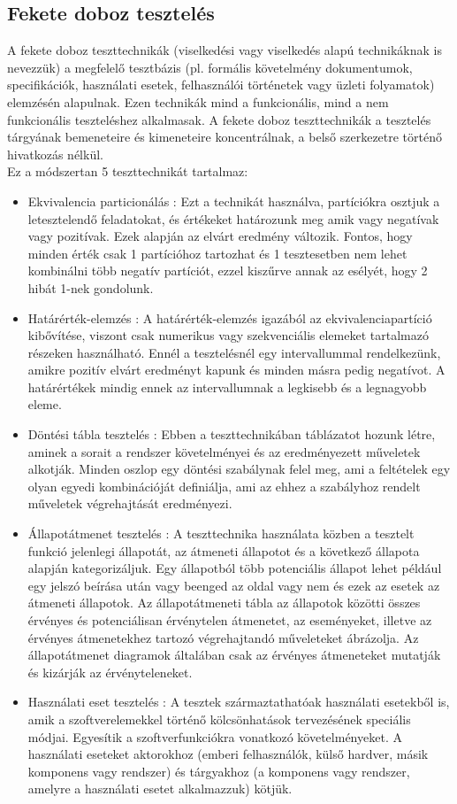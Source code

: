 \subsection{Fekete doboz tesztelés} A fekete doboz teszttechnikák (viselkedési vagy viselkedés alapú technikáknak is nevezzük) a megfelelő
tesztbázis (pl. formális követelmény dokumentumok, specifikációk, használati esetek, felhasználói történetek
vagy üzleti folyamatok) elemzésén alapulnak. Ezen technikák mind a funkcionális, mind a nem funkcionális
teszteléshez alkalmasak. A fekete doboz teszttechnikák a tesztelés tárgyának bemeneteire és kimeneteire
koncentrálnak, a belső szerkezetre történő hivatkozás nélkül.\\
Ez a módszertan 5 teszttechnikát tartalmaz:
\begin{itemize}
\item Ekvivalencia particionálás : Ezt a technikát használva, partíciókra osztjuk a letesztelendő feladatokat, és értékeket határozunk meg amik vagy negatívak vagy pozitívak. Ezek alapján az elvárt eredmény változik. Fontos, hogy minden érték csak 1 partícióhoz tartozhat és 1 tesztesetben nem lehet kombinálni több negatív partíciót, ezzel kiszűrve annak az esélyét, hogy 2 hibát 1-nek gondolunk\cite{syllabus2}.
\item Határérték-elemzés : A határérték-elemzés igazából az ekvivalenciapartíció kibővítése, viszont csak numerikus vagy szekvenciális elemeket tartalmazó részeken használható. Ennél a tesztelésnél egy intervallummal rendelkezünk, amikre pozitív elvárt eredményt kapunk és minden másra pedig negatívot. A határértékek mindig ennek az intervallumnak a legkisebb és a legnagyobb eleme\cite{syllabus2}.
\item Döntési tábla tesztelés : Ebben a teszttechnikában táblázatot hozunk létre, aminek a sorait a rendszer követelményei és az eredményezett műveletek alkotják. Minden oszlop egy döntési szabálynak felel meg, ami a feltételek egy olyan egyedi kombinációját definiálja, ami az ehhez a szabályhoz rendelt műveletek végrehajtását eredményezi\cite{syllabus2}.
\item Állapotátmenet tesztelés : A teszttechnika használata közben a tesztelt funkció jelenlegi állapotát, az átmeneti állapotot és a következő állapota alapján kategorizáljuk. Egy állapotból több potenciális állapot lehet például egy jelszó beírása után vagy beenged az oldal vagy nem és ezek az esetek az átmeneti állapotok. Az állapotátmeneti tábla az állapotok közötti összes érvényes és potenciálisan érvénytelen átmenetet, az eseményeket, illetve az érvényes átmenetekhez tartozó végrehajtandó műveleteket ábrázolja. Az állapotátmenet diagramok általában csak az érvényes átmeneteket mutatják és kizárják az érvényteleneket\cite{syllabus2}.
\item Használati eset tesztelés : A tesztek származtathatóak használati esetekből is, amik a szoftverelemekkel történő kölcsönhatások tervezésének speciális módjai. Egyesítik a szoftverfunkciókra vonatkozó követelményeket. A használati eseteket aktorokhoz (emberi felhasználók, külső hardver, másik komponens vagy rendszer) és tárgyakhoz (a komponens vagy rendszer, amelyre a használati esetet alkalmazzuk) kötjük\cite{syllabus2}.
\end{itemize}

